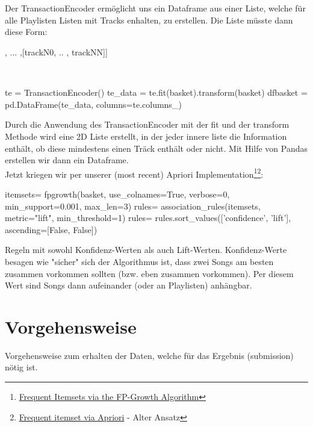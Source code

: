 \documentclass[12pt]{article}
\begin{document}
\\\\
Der TransactionEncoder ermöglicht uns ein Dataframe aus einer Liste, welche für alle Playlisten Listen mit Tracks enhalten, zu erstellen. Die Liste müsste dann diese Form: 
\begin{python}
[[track00, .. , track0N], ... ,[trackN0, .. , trackNN]] 
\end{python}\\
\begin{python}
te = TransactionEncoder()
te_data = te.fit(basket).transform(basket)
dfbasket = pd.DataFrame(te_data, columns=te.columns_)
\end{python}
Durch die Anwendung des TransactionEncoder mit der \color{mymauve}fit \color{black} und der \color{mymauve}transform \color{black} Methode wird eine 2D Liste erstellt, in der jeder innere liste die Information enthält, ob diese mindestens einen Träck enthält oder nicht. Mit Hilfe von Pandas erstellen wir dann ein Dataframe.
\\
Jetzt kriegen wir per unserer (most recent) Apriori Implementation\footnote{\href{http://rasbt.github.io/mlxtend/user_guide/frequent_patterns/fpgrowth/}{Frequent Itemsets via the FP-Growth Algorithm}}\footnote{\href{http://rasbt.github.io/mlxtend/user_guide/frequent_patterns/apriori/}{Frequent itemset via Apriori} - Alter Ansatz}:
\begin{python}
itemsets= fpgrowth(basket, use_colnames=True, verbose=0, min_support=0.001, max_len=3)
rules= association_rules(itemsets, metric="lift", min_threshold=1)
rules= rules.sort_values(['confidence', 'lift'], ascending=[False, False])
\end{python}
Regeln mit sowohl Konfidenz-Werten als auch Lift-Werten. Konfidenz-Werte besagen wie "sicher" sich der Algorithmus ist, dass zwei Songs am besten
zusammen vorkommen sollten (bzw. eben zusammen vorkommen). Per diesem Wert sind Songs dann aufeinander (oder an Playlisten) anhängbar.

\section{Vorgehensweise}
Vorgehensweise zum erhalten der Daten, welche für das Ergebnis (submission) nötig ist.
\end{document}
